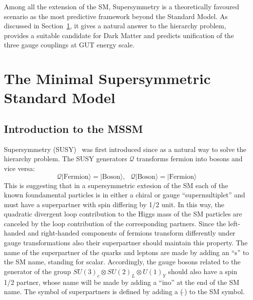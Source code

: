 Among all the extension of the SM, Supersymmetry is a theoretically favoured scenario as the most predictive framework beyond the Standard Model.
As discussed in Section~\ref{sec:MSSM}, it gives a natural answer to the hierarchy problem, provides a suitable candidate for Dark Matter
and predicts unification of the three gauge couplings at GUT energy scale.


%
%

 
\section{The Minimal Supersymmetric Standard Model}\label{sec:MSSM}
\subsection{Introduction to the MSSM}
Supersymmetry (SUSY)~\cite{Susy1,Susy2,Susy3} was first introduced since as a natural way to solve the hierarchy problem.
The SUSY generators $\mathcal{Q}$ transforms fermion into bosons and vice versa:
\begin{equation}
\mathcal{Q}|\text{Fermion}\rangle = |\text{Boson}\rangle, ~ ~ ~ \mathcal{Q}|\text{Boson}\rangle = |\text{Fermion}\rangle
\end{equation}
This is suggesting that in a supersymmetric extesion of the SM  each of the known foundamental particles 
is in either a chiral or gauge ``supermultiplet'' and must have a superpartner with spin differing by 1/2 unit.
In this way, the quadratic divergent loop contribution to the Higgs mass of the SM 
particles are canceled by the loop contribution of the corresponding partners. 
Since the left-handed and right-handed components of fermions transform differently under gauge transformations also their superpartner 
should maintain this property. The name of the superpartner of the quarks and leptons are made by adding an ``s'' to the SM name, standing for scalar.
Accordingly, the gauge bosons related to the generator of the group $SU(3)_c \otimes SU(2)_L \otimes U(1)_Y$ should also have a spin 1/2 partner,
whose name will be made by adding a ``ino'' at the end of the SM name. The symbol of superpartners is defined by adding a ($\tilde{ ~ }$) to the SM symbol.


